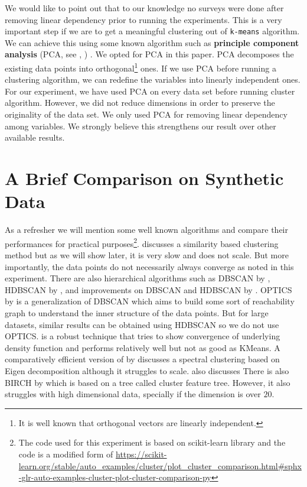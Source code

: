 \documentclass[12pt]{article}
\begin{document}
	We would like to point out that to our knowledge no surveys were done after removing linear dependency prior to running the experiments. This is a very important step if we are to get a meaningful clustering out of \texttt{k-means} algorithm. We can achieve this using some known algorithm such as \textbf{principle component analysis} (PCA, see \textcite{pearson_1901}, \textcite{hotelling_1933}) . We opted for PCA in this paper. PCA decomposes the existing data points into orthogonal\footnote{It is well known that orthogonal vectors are linearly independent.} ones. If we use PCA before running a clustering algorithm, we can redefine the variables into linearly independent ones. For our experiment, we have used PCA on every data set before running cluster algorithm. However, we did not reduce dimensions in order to preserve the originality of the data set. We only used PCA for removing linear dependency among variables. We strongly believe this strengthens our result over other available results.
	\section{A Brief Comparison on Synthetic Data}
	As a refresher we will mention some well known algorithms and compare their performances for practical purposes\footnote{The code used for this experiment is based on scikit-learn library and the code is a modified form of \url{https://scikit-learn.org/stable/auto_examples/cluster/plot_cluster_comparison.html#sphx-glr-auto-examples-cluster-plot-cluster-comparison-py}}. \textcite{Frey_Dueck_2007} discusses a similarity based clustering method but as we will show later, it is very slow and does not scale. But more importantly, the data points do not necessarily always converge as noted in this experiment. There are also hierarchical algorithms such as DBSCAN by \textcite{Ester_Kriegel_Sander_Xu_1996}, HDBSCAN by \textcite{Campello_Moulavi_Sander_2013}, and improvements on DBSCAN and HDBSCAN by \textcite{McInnes_Healy_2017}. OPTICS by \textcite{Ankerst_Breunig_Kriegel_Sander_1999} is a generalization of DBSCAN which aims to build some sort of reachability graph to understand the inner structure of the data points. But for large datasets, similar results can be obtained using HDBSCAN so we do not use OPTICS. \textcite{Comaniciu_Meer_2002} is a robust technique that tries to show convergence of underlying density function and performs relatively well but not as good as KMeans. A comparatively efficient version of \textcite{Yu_Shi_2003} by \textcite{Damle_Minden_Ying_2018} discusses a spectral clustering based on Eigen decomposition although it struggles to scale. \textcite{forgy_1965} also discusses There is also BIRCH by \textcite{Zhang_Ramakrishnan_Livny_1996} which is based on a tree called cluster feature tree. However, it also struggles with high dimensional data, specially if the dimension is over $20$.
\end{document}
